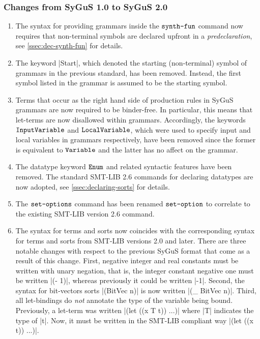 \documentclass[english,a4paper,10pt]{article}
\begin{document}
\subsubsection{Changes from SyGuS 1.0 to SyGuS 2.0}
\begin{enumerate}

\item The syntax for providing grammars inside the $\texttt{synth-fun}$ command
now requires that non-terminal symbols are declared upfront
in a \emph{predeclaration}, see \cref{ssec:dec-synth-fun}
for details.

\item 
The keyword \code|Start|, which 
denoted the starting (non-terminal) symbol of
grammars in the previous standard, has been removed.
Instead, the first symbol listed in the grammar is assumed
to be the starting symbol.

\item 
Terms that occur as the right hand side of production rules in
SyGuS grammars are now required to be binder-free.
In particular, this means that let-terms are now disallowed within grammars.
Accordingly,
the keywords $\texttt{InputVariable}$ and $\texttt{LocalVariable}$,
which were used to specify input and local variables in grammars
respectively, have been removed since the former is equivalent to $\texttt{Variable}$
and the latter has no affect on the grammar.

\item The datatype keyword $\texttt{Enum}$
and related syntactic features have been removed.
The standard SMT-LIB 2.6 commands
for declaring datatypes are now adopted,
see \cref{ssec:declaring-sorts} for details.

\item The $\texttt{set-options}$ command has been renamed $\texttt{set-option}$ to 
correlate to the existing SMT-LIB version 2.6 command.

\item 
The syntax for terms and sorts
now coincides with the corresponding syntax for terms and sorts 
from SMT-LIB versions 2.0 and later.
There are three notable changes
with respect to the previous SyGuS format that come as a result of this change.
First,
negative integer and real constants must be written with
unary negation, that is, the integer constant negative one
must be written \code|(- 1)|, whereas previously it could
be written \code|-1|.
Second,
the syntax for bit-vectors sorts \code|(BitVec n)|
is now written  \code|(_ BitVec n)|.
Third,
all let-bindings do \emph{not} annotate the type of the variable being bound.
Previously, a let-term was written \code|(let ((x T t)) ...)|
where \code|T| indicates the type of \code|t|.
Now, it must be written in the SMT-LIB compliant
way \code|(let ((x t)) ...)|.


\end{enumerate}
\end{document}
